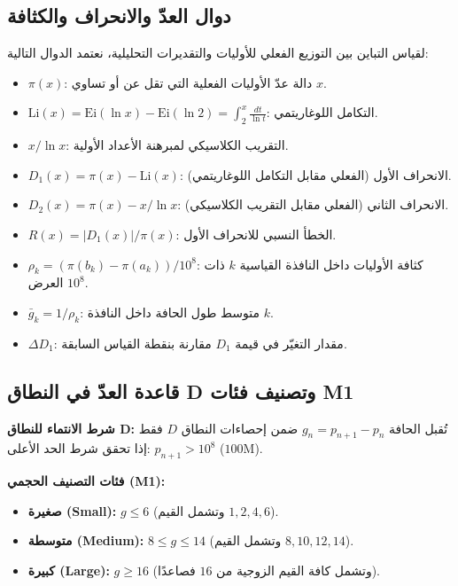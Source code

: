 \documentclass[12pt,a4paper]{article}
\begin{document}
\subsection{دوال العدّ والانحراف والكثافة}
لقياس التباين بين التوزيع الفعلي للأوليات والتقديرات التحليلية، نعتمد الدوال التالية:
\begin{itemize}
    \item $\pi(x)$: دالة عدّ الأوليات الفعلية التي تقل عن أو تساوي $x$.
    \item $\mathrm{Li}(x) = \mathrm{Ei}(\ln x) - \mathrm{Ei}(\ln 2) = \int_2^x \frac{dt}{\ln t}$: التكامل اللوغاريتمي.
    \item $x / \ln x$: التقريب الكلاسيكي لمبرهنة الأعداد الأولية.
    \item $D_1(x) = \pi(x) - \mathrm{Li}(x)$: الانحراف الأول (الفعلي مقابل التكامل اللوغاريتمي).
    \item $D_2(x) = \pi(x) - x/\ln x$: الانحراف الثاني (الفعلي مقابل التقريب الكلاسيكي).
    \item $R(x) = |D_1(x)| / \pi(x)$: الخطأ النسبي للانحراف الأول.
    \item $\rho_k = (\pi(b_k) - \pi(a_k)) / 10^8$: كثافة الأوليات داخل النافذة القياسية $k$ ذات العرض $10^8$.
    \item $\bar{g}_k = 1 / \rho_k$: متوسط طول الحافة داخل النافذة $k$.
    \item $\Delta D_1$: مقدار التغيّر في قيمة $D_1$ مقارنة بنقطة القياس السابقة.
\end{itemize}

\subsection{قاعدة العدّ في النطاق \textenglish{D} وتصنيف فئات \textenglish{M1}}
\textbf{شرط الانتماء للنطاق \textenglish{D}:} تُقبل الحافة $g_n = p_{n+1} - p_n$ ضمن إحصاءات النطاق $D$ فقط إذا تحقق شرط الحد الأعلى: $p_{n+1} > 10^8$ ($100\text{M}$).

\noindent \textbf{فئات التصنيف الحجمي (\textenglish{M1}):}
\begin{itemize}
    \item \textbf{صغيرة (\textenglish{Small}):} $g \leq 6$ (وتشمل القيم $1, 2, 4, 6$).
    \item \textbf{متوسطة (\textenglish{Medium}):} $8 \leq g \leq 14$ (وتشمل القيم $8, 10, 12, 14$).
    \item \textbf{كبيرة (\textenglish{Large}):} $g \geq 16$ (وتشمل كافة القيم الزوجية من $16$ فصاعدًا).
\end{itemize}
\end{document}
